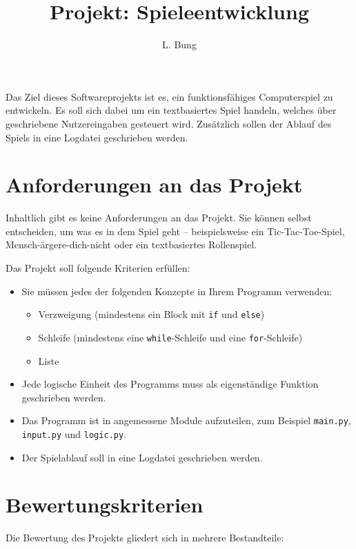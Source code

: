 \documentclass[11pt, a4paper, oneside]{article}
\begin{document}
	\author{L. Bung}
	\title{Projekt: Spieleentwicklung}
	\subject{Informatik}
	\maketitle
	
	Das Ziel dieses Softwareprojekts ist es, ein funktionsfähiges Computerspiel zu entwickeln.
	Es soll sich dabei um ein textbasiertes Spiel handeln, welches über geschriebene Nutzereingaben gesteuert wird.
	Zusätzlich sollen der Ablauf des Spiels in eine Logdatei geschrieben werden.
	
	
	\section{Anforderungen an das Projekt}
	
	Inhaltlich gibt es keine Anforderungen an das Projekt.
	Sie können selbst entscheiden, um was es in dem Spiel geht -- beispielsweise ein Tic-Tac-Toe-Spiel, Mensch-ärgere-dich-nicht oder ein textbasiertes Rollenspiel.
	
	Das Projekt soll folgende Kriterien erfüllen:
	
	\begin{itemize}
		\item Sie müssen jedes der folgenden Konzepte in Ihrem Programm verwenden:
		\begin{itemize}
			\item Verzweigung (mindestens ein Block mit \texttt{if} und \texttt{else})
			\item Schleife (mindestens eine \texttt{while}-Schleife und eine \texttt{for}-Schleife)
			\item Liste
		\end{itemize}
		\item Jede logische Einheit des Programms muss als eigenständige Funktion geschrieben werden.
		\item Das Programm ist in angemessene Module aufzuteilen, zum Beispiel \texttt{main.py}, \texttt{input.py} und \texttt{logic.py}.
		\item Der Spielablauf soll in eine Logdatei geschrieben werden.
	\end{itemize}
	
	\section{Bewertungskriterien}
	
	Die Bewertung des Projekts gliedert sich in mehrere Bestandteile:
	
\end{document}
